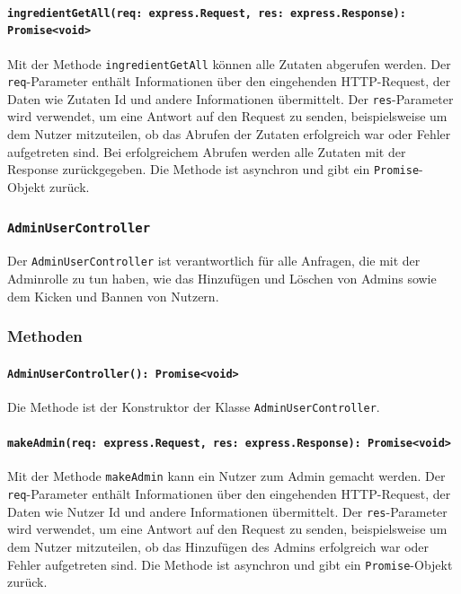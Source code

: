 \documentclass{entwurfsheft}
\begin{document}
\begin{sloppypar}
\paragraph{\texttt{ingredientGetAll(req: express.Request, res: express.Response): Promise<void>\\}}
Mit der Methode \texttt{ingredientGetAll} können alle Zutaten abgerufen werden. Der \texttt{req}-Parameter enthält Informationen über den eingehenden HTTP-Request, der Daten wie Zutaten Id und andere Informationen übermittelt. Der \texttt{res}-Parameter wird verwendet, um eine Antwort auf den Request zu senden, beispielsweise um dem Nutzer mitzuteilen, ob das Abrufen der Zutaten erfolgreich war oder Fehler aufgetreten sind. Bei erfolgreichem Abrufen werden alle Zutaten mit der Response zurückgegeben.
Die Methode ist asynchron und gibt ein \texttt{Promise}-Objekt zurück.

\subsubsection{\texttt{AdminUserController}}\label{sec:AdminUserController}
Der \texttt{AdminUserController} ist verantwortlich für alle Anfragen, die mit der Adminrolle zu tun haben, wie das Hinzufügen und Löschen von Admins sowie dem Kicken und Bannen von Nutzern.
\subsubsection*{Methoden}
\paragraph{\texttt{AdminUserController(): Promise<void>\\}}
Die Methode ist der Konstruktor der Klasse \texttt{AdminUserController}.
\paragraph{\texttt{makeAdmin(req: express.Request, res: express.Response): Promise<void>\\}}
Mit der Methode \texttt{makeAdmin} kann ein Nutzer zum Admin gemacht werden. Der \texttt{req}-Parameter enthält Informationen über den eingehenden HTTP-Request, der Daten wie Nutzer Id und andere Informationen übermittelt. Der \texttt{res}-Parameter wird verwendet, um eine Antwort auf den Request zu senden, beispielsweise um dem Nutzer mitzuteilen, ob das Hinzufügen des Admins erfolgreich war oder Fehler aufgetreten sind.
Die Methode ist asynchron und gibt ein \texttt{Promise}-Objekt zurück.

\end{sloppypar}
\end{document}
